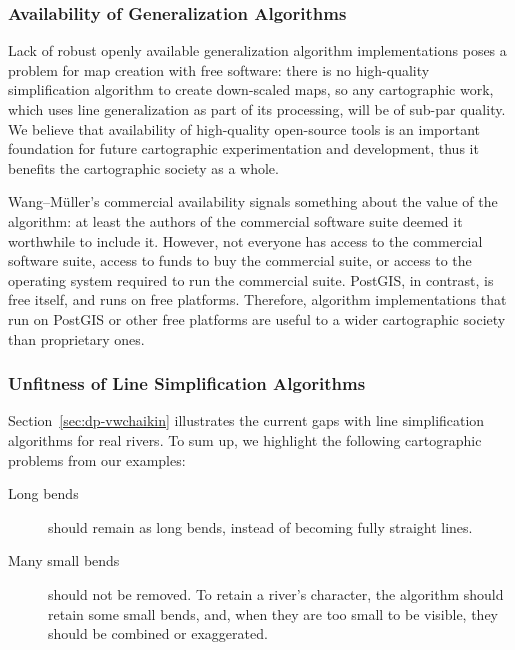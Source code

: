 \documentclass[a4paper]{article}
\newcommand{\WM}{Wang--M{\"u}ller}
\begin{document}
\subsubsection{Availability of Generalization Algorithms}

Lack of robust openly available generalization algorithm implementations poses
a problem for map creation with free software: there is no high-quality
simplification algorithm to create down-scaled maps, so any cartographic work,
which uses line generalization as part of its processing, will be of sub-par
quality. We believe that availability of high-quality open-source tools is an
important foundation for future cartographic experimentation and development,
thus it benefits the cartographic society as a whole.

{\WM}'s commercial availability signals something about the value of the
algorithm: at least the authors of the commercial software suite deemed it
worthwhile to include it. However, not everyone has access to the commercial
software suite, access to funds to buy the commercial suite, or access to the
operating system required to run the commercial suite. PostGIS, in contrast, is
free itself, and runs on free platforms. Therefore, algorithm
implementations that run on PostGIS or other free platforms are useful to a
wider cartographic society than proprietary ones.

\subsubsection{Unfitness of Line Simplification Algorithms}

Section~\ref{sec:dp-vwchaikin} illustrates the current gaps with line
simplification algorithms for real rivers. To sum up, we highlight the
following cartographic problems from our examples:

\begin{description}

    \item[Long bends] should remain as long bends, instead of becoming fully
        straight lines.

    \item[Many small bends] should not be removed. To retain a river's character,
        the algorithm should retain some small bends, and, when they are too
        small to be visible, they should be combined or exaggerated.

\end{description}
\end{document}
